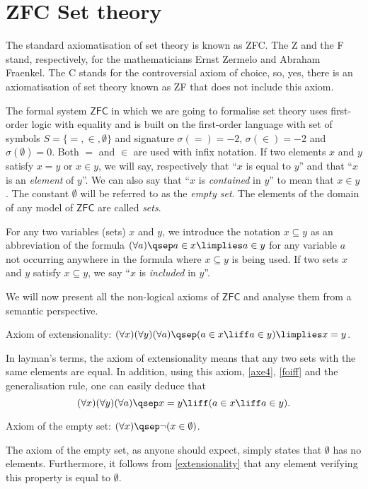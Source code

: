 
\section{ZFC Set theory}

\begin{para}
The standard axiomatisation of set theory is known as ZFC. The Z and the F stand, respectively, for the mathematicians Ernst Zermelo and Abraham Fraenkel. The C stands for the controversial axiom of choice, so, yes, there is an axiomatisation of set theory known as ZF that does not include this axiom.

The formal system $\mathsf{ZFC}$ in which we are going to formalise set theory uses first-order logic with equality and is built on the first-order language with set of symbols $S = \{=,\in,\emptyset\}$ and signature $\sigma(=) = -2$,  $\sigma(\in) = -2$ and $\sigma(\emptyset) = 0$. Both $=$ and $\in$ are used with infix notation.
If two elements $x$ and $y$ satisfy $x = y$ or $x\in y$, we will say, respectively that ``$x$ is equal to $y$'' and that ``$x$ is an \emph{element} of $y$''.
We can also say that ``$x$ is \emph{contained} in $y$'' to mean that $x\in y$.
The constant $\emptyset$ will be referred to as the \emph{empty set}.
The elements of the domain of any model of $\mathsf{ZFC}$ are called \emph{sets}.

For any two variables (sets) $x$ and $y$, we introduce the notation $x\subseteq y$ as an abbreviation of the formula $(\forall a)\qsep a\in x \limplies a \in y$ for any variable $a$ not occurring anywhere in the formula where $x\subseteq y$ is being used.
If two sets $x$ and $y$ satisfy $x\subseteq y$, we say ``$x$ is \emph{included} in $y$''.

We will now present all the non-logical axioms of $\mathsf{ZFC}$ and analyse them from a semantic perspective.
\begin{axioms}[ZF]
\item \label{extensionality} Axiom of extensionality: $(\forall x)(\forall y)(\forall a)\qsep (a \in x \liff a\in y) \limplies x = y$.
\end{axioms}
In layman's terms, the axiom of extensionality means that any two sets with the same elements are equal.
In addition, using this axiom, \ref{axe4}, \ref{foiff} and the generalisation rule, one can easily deduce that
\[(\forall x)(\forall y)(\forall a)\qsep x = y \liff (a\in x \liff a \in y).\]

\begin{axioms}
\item \label{emptyset} Axiom of the empty set: $(\forall x)\qsep \lnot(x\in\emptyset)$.
\end{axioms}
The axiom of the empty set, as anyone should expect, simply states that $\emptyset$ has no elements. Furthermore, it follows from \ref{extensionality} that any element verifying this property is equal to $\emptyset$.


\end{para}
